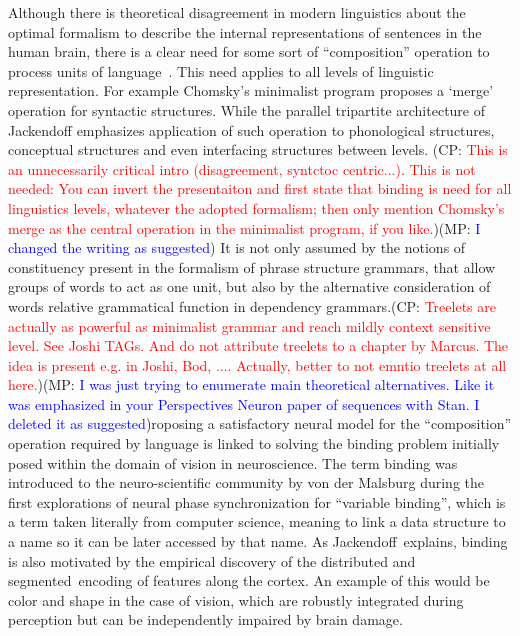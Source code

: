 \documentclass[10pt]{article}
\newcommand{\noteCP}[1]{(CP: \textcolor{red}{#1})}
\newcommand{\noteMP}[2]{(MP: \textcolor{blue}{#1})}
\begin{document}
Although there is theoretical disagreement in modern linguistics about
the optimal formalism to describe the internal representations of
sentences in the human brain, there is a clear need for some sort of
``composition'' operation to process units of language~\cite{Dehaene_2015}. This need applies to all levels of linguistic representation. For example Chomsky's minimalist program \cite{Chomsky_2013} proposes a `merge' operation for syntactic structures. While the parallel tripartite architecture of Jackendoff
\cite{Jackendoff_2002a} emphasizes application of such operation to phonological structures, conceptual
structures and even interfacing structures between levels.
\noteCP{This is an unnecessarily critical
  intro (disagreement, syntctoc centric...). This is not needed: You
  can invert the presentaiton and first state that binding is need for
  all linguistics levels, whatever the adopted formalism; then only
  mention Chomsky's merge as the central operation in the minimalist
  program, if you like.}\noteMP{I changed the writing as suggested}.
It is not only assumed by the notions of
constituency present in the formalism of phrase structure grammars,
that allow groups of words to act as one unit, but also by the
alternative consideration of words relative grammatical function in
dependency grammars.\noteCP{Treelets are actually as powerful as
  minimalist grammar and reach mildly context sensitive level. See
  Joshi TAGs. And do not attribute treelets to a chapter by Marcus.
  The idea is present e.g. in Joshi, Bod, .... Actually, better to not
  emntio treelets at all here.}\noteMP{I was just trying to enumerate main theoretical alternatives. Like it was emphasized in your Perspectives Neuron paper of sequences with Stan. I deleted it as suggested}


Proposing a satisfactory neural model for the ``composition''
operation required by language is linked to solving the binding
problem initially posed within the domain of vision in neuroscience.
The term binding was introduced to the neuro-scientific community by
von der Malsburg\cite{von_der_Malsburg_1994} during the first
explorations of neural phase synchronization for ``variable binding'',
which is a term taken literally from computer science, meaning to link
a data structure to a name so it can be later accessed by that name.
As Jackendoff\cite{Jackendoff_2002b}~explains, binding is also
motivated by the empirical discovery of the distributed and
segmented~encoding of features along the cortex. An example of this
would be color and shape in the case of vision, which are robustly
integrated during perception but can be independently impaired by
brain damage.
\end{document}
